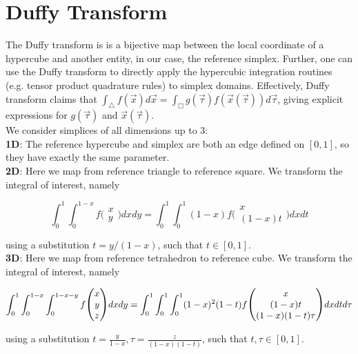 \section{Duffy Transform}

The Duffy transform is is a bijective map between the local coordinate of a hypercube and another entity, in our case, the reference simplex. Further, one can use the Duffy transform to directly apply the hypercubic integration routines (e.g. tensor product quadrature rules) to simplex domains. Effectively, Duffy transform claims that $ \int_{\triangle} f(\vec{x}) d\vec{x} = \int_{\Box} g(\vec{\tau}) f(\vec{x}(\vec{\tau})) d\vec{\tau}$, giving explicit expressions for $g(\vec{\tau})$ and $\vec{x}(\vec{\tau})$. \\

\noindent
We consider simplices of all dimensions up to 3: \\

\noindent
\textbf{1D}: The reference hypercube and simplex are both an edge defined on $[0, 1]$, so they have exactly the same parameter. \\

\noindent
\textbf{2D}: Here we map from reference triangle to reference square. We transform the integral of interest, namely

\[ \int_0^1 \int_0^{1-x} f \biggl(
\begin{matrix}  x \\ y  \end{matrix} \biggr)
 dx dy = \int_0^1 \int_0^1 (1-x) 
f \biggl( \begin{matrix} x \\ (1-x)t \end{matrix} \biggr)
dx dt \]

\noindent
using a substitution $t = y / (1 - x)$, such that $t \in [0, 1]$. \\

\noindent
\textbf{3D}: Here we map from reference tetrahedron to reference cube. We transform the integral of interest, namely

\[ \int_0^1 \int_0^{1-x} \int_0^{1-x-y} f \scalebox{1.2}{\Bigg(}
\begin{matrix}  x \\ y \\ z  \end{matrix} \scalebox{1.2}{\Bigg)}
dx dy = \int_0^1 \int_0^1 \int_0^1 (1-x)^2 (1-t)
f \scalebox{1.2}{\Bigg(} \begin{matrix}  x \\ (1-x)t \\ (1-x)(1-t)\tau  \end{matrix} \scalebox{1.2}{\Bigg)}
dx dt d\tau \]

\noindent
using a substitution $t = \frac{y}{1 - x}, \tau = \frac{z}{(1 - x)(1 - t)}$, such that $t,\tau \in [0, 1]$. \\